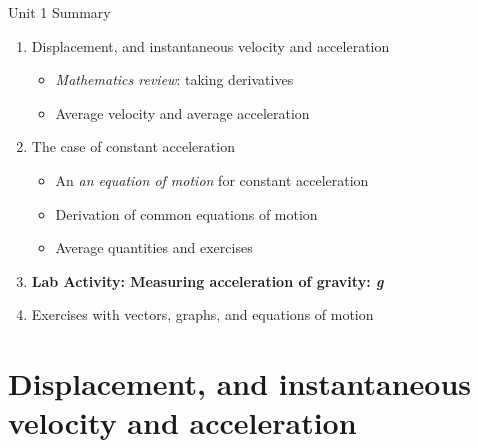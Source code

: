 \documentclass{beamer}
\begin{document}
\begin{frame}{Unit 1 Summary}
\begin{enumerate}
\item Displacement, and instantaneous velocity and acceleration
\begin{itemize}
\item \textit{Mathematics review}: taking derivatives
\item Average velocity and average acceleration
\end{itemize}
\item The case of constant acceleration
\begin{itemize}
\item An \textit{an equation of motion} for constant acceleration
\item Derivation of \alert{common equations of motion}
\item Average quantities and exercises
\end{itemize}
\item \textbf{Lab Activity: Measuring acceleration of gravity: \textit{g}}
\item Exercises with vectors, graphs, and equations of motion
\end{enumerate}
\end{frame}

\section{Displacement, and instantaneous velocity and acceleration}
\end{document}
